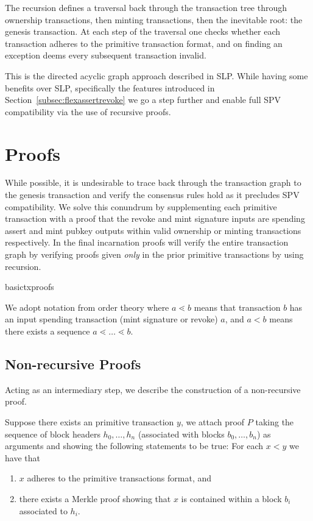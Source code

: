\documentclass[9pt,oneside]{amsart}
\begin{document}
The recursion defines a traversal back through the transaction tree through ownership transactions, then minting transactions, then the inevitable root: the genesis transaction. At each step of the traversal one checks whether each transaction adheres to the primitive transaction format, and on finding an exception deems every subsequent transaction invalid.

This is the directed acyclic graph approach described in SLP. While having some benefits over SLP, specifically the features introduced in Section~\ref{subsec:flexassertrevoke} we go a step further and enable full SPV compatibility via the use of recursive proofs.
    
\section{Proofs}
While possible, it is undesirable to trace back through the transaction graph to the genesis transaction and verify the consensus rules hold as it precludes SPV compatibility. We solve this conundrum by supplementing each primitive transaction with a proof that the revoke and mint signature inputs are spending assert and mint pubkey outputs within valid ownership or minting transactions respectively. In the final incarnation proofs will verify the entire transaction graph by verifying proofs given \emph{only} in the prior primitive transactions by using recursion.

\begin{center}
    {basictxproofs}
\end{center}

We adopt notation from order theory where $a \lessdot b$ means that transaction $b$ has an input spending transaction (mint signature or revoke) $a$, and $a < b$ means there exists a sequence $a \lessdot \dots \lessdot b$.
\subsection{Non-recursive Proofs}
Acting as an intermediary step, we describe the construction of a non-recursive proof.


Suppose there exists an primitive transaction $y$, we attach proof $P$ taking the sequence of block headers $h_{0}, \dots, h_{n}$ (associated with blocks $b_{0}, \dots, b_{n}$) as arguments and showing the following statements to be true:
For each $x < y$ we have that
\begin{enumerate}
    \item $x$ adheres to the primitive transactions format, and
    \item there exists a Merkle proof showing that $x$ is contained within a block $b_{i}$ associated to $h_{i}$.
\end{enumerate}
\end{document}
